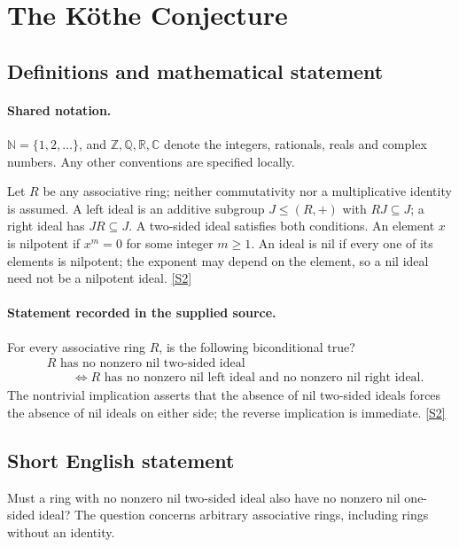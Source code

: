 \documentclass[11pt]{article}
\newcommand{\sref}[2]{\hyperlink{source:#1:#2}{[S#2]}}
\begin{document}
\section{The Köthe Conjecture}\label{statement}

\subsection{Definitions and mathematical statement}

\paragraph{Shared notation.}$\mathbb N=\{1,2,\ldots\}$, and $\mathbb Z,\mathbb Q,\mathbb R,\mathbb C$ denote the integers, rationals, reals and complex numbers. Any other conventions are specified locally.


Let $R$ be any associative ring; neither commutativity nor a multiplicative identity is assumed. A left ideal is an additive subgroup $J\le(R,+)$ with $RJ\subseteq J$; a right ideal has $JR\subseteq J$. A two-sided ideal satisfies both conditions. An element $x$ is nilpotent if $x^m=0$ for some integer $m\ge1$. An ideal is nil if every one of its elements is nilpotent; the exponent may depend on the element, so a nil ideal need not be a nilpotent ideal. \sref{statement}{2}
\paragraph{Statement recorded in the supplied source.}
For every associative ring $R$, is the following biconditional true?
\[
 \begin{aligned}
 &R\text{ has no nonzero nil two-sided ideal}\\
 &\qquad\Longleftrightarrow
 R\text{ has no nonzero nil left ideal and no nonzero nil right ideal}.
 \end{aligned}
\]
The nontrivial implication asserts that the absence of nil two-sided ideals forces the absence of nil ideals on either side; the reverse implication is immediate. \sref{statement}{2}
\subsection{Short English statement}
Must a ring with no nonzero nil two-sided ideal also have no nonzero nil one-sided ideal? The question concerns arbitrary associative rings, including rings without an identity.
\end{document}
